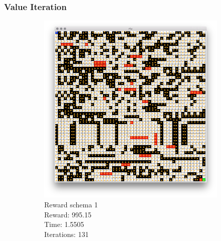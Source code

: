 \documentclass[a4paper,10pt]{article}
\begin{document}
\subsubsection{Value Iteration}
\begin{figure}[H]
        \centering
        \begin{subfigure}[b]{0.3\textwidth}
                \includegraphics[width=\textwidth]{figures/50x50_v_r1.png}
                \caption{Reward schema 1\\
                Reward:  995.15\\
                Time:  1.5505\\
                Iterations: 131}
                \label{fig:gull}
        \end{subfigure}%
        ~ %
        \begin{subfigure}[b]{0.3\textwidth}

\end{subfigure}
\end{figure}
\end{document}
